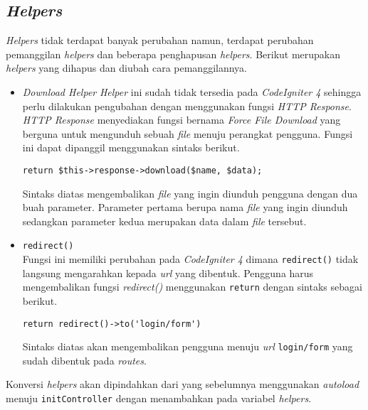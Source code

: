 \subsection{\textit{Helpers}}
\textit{Helpers} tidak terdapat banyak perubahan namun, terdapat perubahan pemanggilan \textit{helpers} dan beberapa penghapusan \textit{helpers}. Berikut merupakan \textit{helpers} yang dihapus dan diubah cara pemanggilannya.
\begin{itemize}
\item \textit{Download Helper}
\textit{Helper} ini sudah tidak tersedia pada \textit{CodeIgniter 4} sehingga perlu dilakukan pengubahan dengan menggunakan fungsi \textit{HTTP Response}. \textit{HTTP Response} menyediakan fungsi bernama \textit{Force File Download} yang berguna untuk mengunduh sebuah \textit{file} menuju perangkat pengguna. Fungsi ini dapat dipanggil menggunakan sintaks berikut.

\begin{center}
 \verb|return $this->response->download($name, $data);|
\end{center}

Sintaks diatas mengembalikan \textit{file} yang ingin diunduh pengguna dengan dua buah parameter. Parameter pertama berupa nama \textit{file} yang ingin diunduh sedangkan parameter kedua merupakan data dalam \textit{file} tersebut.

\item \texttt{redirect()} \\
Fungsi ini memiliki perubahan pada \textit{CodeIgniter 4} dimana \texttt{redirect()} tidak langsung mengarahkan kepada \textit{url} yang dibentuk. Pengguna harus mengembalikan fungsi \textit{redirect()} menggunakan \texttt{return} dengan sintaks sebagai berikut.
\begin{center}
 \verb|return redirect()->to('login/form')|
\end{center} 

Sintaks diatas akan mengembalikan pengguna menuju \textit{url} \texttt{login/form} yang sudah dibentuk pada \textit{routes}.

\end{itemize}

Konversi \textit{helpers} akan dipindahkan dari yang sebelumnya menggunakan \textit{autoload} menuju \texttt{initController} dengan menambahkan pada variabel \textit{helpers}.
